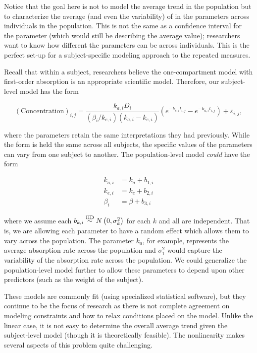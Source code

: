 \documentclass[
]{book}
\theoremstyle{plain}
\theoremstyle{mydefn}
\theoremstyle{myexmpl}
\theoremstyle{remark}
\begin{document}
Notice that the goal here is not to model the average trend in the population but to characterize the average (and even the variability) of in the parameters across individuals in the population. This is not the same as a confidence interval for the parameter (which would still be describing the average value); researchers want to know how different the parameters can be across individuals. This is the perfect set-up for a subject-specific modeling approach to the repeated measures.

Recall that within a subject, researchers believe the one-compartment model with first-order absorption is an appropriate scientific model. Therefore, our subject-level model has the form

\[(\text{Concentration})_{i,j} = \frac{k_{a,i} D_i}{\left(\beta_i/k_{e,i}\right)\left(k_{a,i} - k_{e,i}\right)} \left(e^{-k_{e,i} t_{i,j}} - e^{-k_{a,i} t_{i,j}}\right) + \varepsilon_{i,j},\]

where the parameters retain the same interpretations they had previously. While the form is held the same across all subjects, the specific values of the parameters can vary from one subject to another. The population-level model \emph{could} have the form

\[
\begin{aligned}
  k_{a,i} &= k_{a} + b_{1,i} \\
  k_{e,i} &= k_{e} + b_{2,i} \\
  \beta_i &= \beta + b_{3,i}
\end{aligned}
\]

where we assume each \(b_{k,i} \stackrel{\text{IID}}{\sim} N\left(0, \sigma^2_k\right)\) for each \(k\) and all are independent. That is, we are allowing each parameter to have a random effect which allows them to vary across the population. The parameter \(k_a\), for example, represents the average absorption rate across the population and \(\sigma_1^2\) would capture the variability of the absorption rate across the population. We could generalize the population-level model further to allow these parameters to depend upon other predictors (such as the weight of the subject).

These models are commonly fit (using specialized statistical software), but they continue to be the focus of research as there is not complete agreement on modeling constraints and how to relax conditions placed on the model. Unlike the linear case, it is not easy to determine the overall average trend given the subject-level model (though it is theoretically feasible). The nonlinearity makes several aspects of this problem quite challenging.
\end{document}
